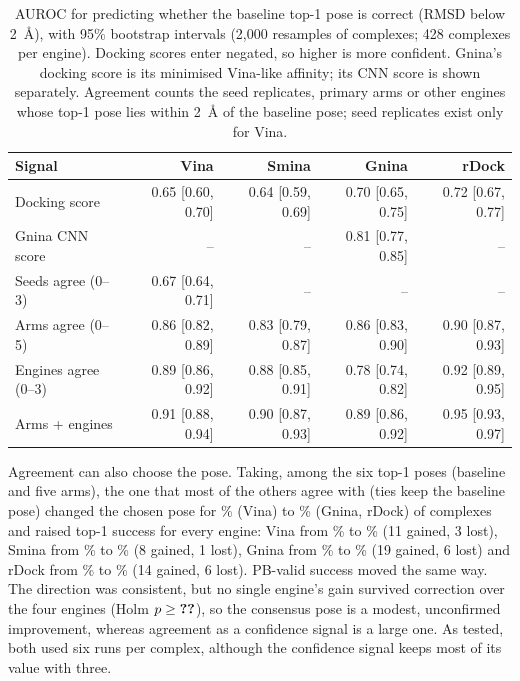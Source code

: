 \begin{table}[h]
  \centering
  \caption{AUROC for predicting whether the baseline top-1 pose is correct (RMSD below
    \SI{2}{\angstrom}), with 95\% bootstrap intervals (2,000 resamples of complexes; 428
    complexes per engine). Docking scores enter negated, so higher is more confident.
    Gnina's docking score is its minimised Vina-like affinity; its CNN score is shown
    separately. Agreement counts the seed replicates, primary arms or other engines whose
    top-1 pose lies within \SI{2}{\angstrom} of the baseline pose; seed replicates exist
    only for Vina.}
  \label{tab:agreement}
  \small
  \setlength{\tabcolsep}{4pt}
  \begin{tabular}{lrrrr}
    \toprule
    Signal & Vina & Smina & Gnina & rDock \\
    \midrule
    Docking score & 0.65 [0.60, 0.70] & 0.64 [0.59, 0.69] & 0.70 [0.65, 0.75] & 0.72 [0.67, 0.77] \\
    Gnina CNN score & -- & -- & 0.81 [0.77, 0.85] & -- \\
    Seeds agree (0--3) & 0.67 [0.64, 0.71] & -- & -- & -- \\
    Arms agree (0--5) & 0.86 [0.82, 0.89] & 0.83 [0.79, 0.87] & 0.86 [0.83, 0.90] & 0.90 [0.87, 0.93] \\
    Engines agree (0--3) & 0.89 [0.86, 0.92] & 0.88 [0.85, 0.91] & 0.78 [0.74, 0.82] & 0.92 [0.89, 0.95] \\
    Arms + engines & 0.91 [0.88, 0.94] & 0.90 [0.87, 0.93] & 0.89 [0.86, 0.92] & 0.95 [0.93, 0.97] \\
    \bottomrule
  \end{tabular}
\end{table}

Agreement can also choose the pose. Taking, among the six top-1 poses (baseline and five
arms), the one that most of the others agree with (ties keep the baseline pose) changed the
chosen pose for \% (Vina) to \% (Gnina, rDock) of complexes and raised top-1 success
for every engine: Vina from \% to \% (11 gained, 3 lost), Smina from \% to
\% (8 gained, 1 lost), Gnina from \% to \% (19 gained, 6 lost) and rDock from
\% to \% (14 gained, 6 lost). PB-valid success moved the same way. The direction was
consistent, but no single engine's gain survived correction over the four engines (Holm
$p \ge \val{agreement_consensus/top1/gnina/p_holm}$), so the consensus pose is a modest, unconfirmed improvement, whereas
agreement as a confidence signal is a large one. As tested, both used six runs per complex,
although the confidence signal keeps most of its value with three.

